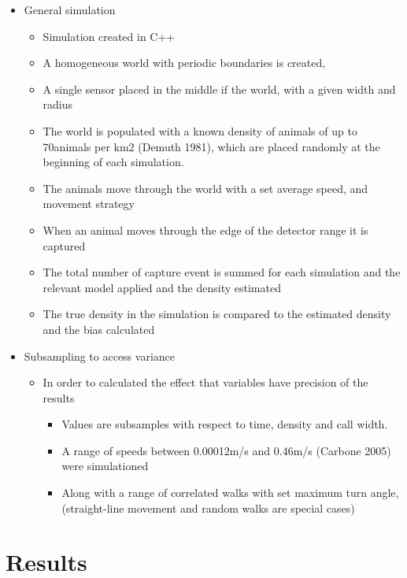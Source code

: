 \documentclass[a4paper,10pt,reqno,oneside]{amsart}
\begin{document}
\begin{itemize}
\item General simulation
	\begin{itemize}
	\item Simulation created in C++
	\item A homogeneous world with periodic boundaries is created, 
	\item A single sensor placed in the middle if the world, with a given width and radius
	\item The world is populated with a known density of animals of up to 70animals per km2 (Demuth 1981), which are placed randomly at the beginning of each simulation.
	\item The animals move through the world with a set average speed, and movement strategy
	\item When an animal moves through the edge of the detector range it is captured
	\item The total number of capture event is summed for each simulation and the relevant model applied and the density estimated
	\item The true density in the simulation is compared to the estimated density and the bias calculated
	\end{itemize}

\item Subsampling to access variance
	\begin{itemize}
	\item In order to calculated the effect that variables have precision of the results
		\begin{itemize}
		\item Values are subsamples with respect to time, density and call width.
		\item A range of speeds between 0.00012m/s and 0.46m/s (Carbone 2005) were simulationed
		\item Along with a range of correlated walks with set maximum turn angle, (straight-line movement and random walks are special cases)
		\end{itemize}
	\end{itemize}
 
\end{itemize}






\section{Results}
\end{document}
